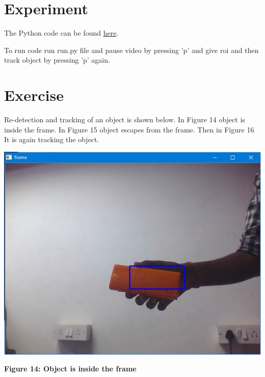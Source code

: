 \documentclass[11pt,a4paper]{article}
\begin{document}
	\section{Experiment}
	The Python code can be found \href{https://github.com/eYSIP-2016/Object-Tracking-Camera/tree/master/Tutorials/4.%20Object%20Tracking%20%28Based%20on%20ROI%29%20and%20Re-recognizing%20the%20object%20if%20it%20escapes%20and%20comes%20back%20into%20the%20frame/code}{here}. 
	\par To run code run run.py file and pause video by pressing 'p' and give roi and then track object by pressing 'p' again.
	\section{Exercise}
	Re-detection and tracking of an object  is shown below. In Figure 14 object is inside the frame. In Figure 15 object escapes from the frame. Then in Figure 16 It is again tracking the object.
	\begin{center}
		\includegraphics[scale=0.8]{Image1.jpg}
	\end{center}
	\begin{center}
		\textbf{Figure 14: Object is inside the frame}
	\end{center}
\end{document}
